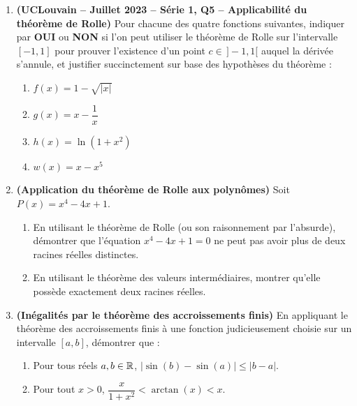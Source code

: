 \begin{enumerate}[label=\textbf{Exercice 3.\arabic* --}]
    \item \textbf{(UCLouvain -- Juillet 2023 -- Série 1, Q5 -- Applicabilité du théorème de Rolle)} Pour chacune des quatre fonctions suivantes, indiquer par \textbf{OUI} ou \textbf{NON} si l'on peut utiliser le théorème de Rolle sur l'intervalle $[-1, 1]$ pour prouver l'existence d'un point $c \in \,]-1, 1[$ auquel la dérivée s'annule, et justifier succinctement sur base des hypothèses du théorème :
    \begin{enumerate}
        \item $f(x) = 1 - \sqrt{|x|}$
        \item $g(x) = x - \dfrac{1}{x}$
        \item $h(x) = \ln(1 + x^2)$
        \item $w(x) = x - x^5$
    \end{enumerate}

    \item \textbf{(Application du théorème de Rolle aux polynômes)} Soit $P(x) = x^4 - 4x + 1$.
    \begin{enumerate}
        \item En utilisant le théorème de Rolle (ou son raisonnement par l'absurde), démontrer que l'équation $x^4 - 4x + 1 = 0$ ne peut pas avoir plus de deux racines réelles distinctes.
        \item En utilisant le théorème des valeurs intermédiaires, montrer qu'elle possède exactement deux racines réelles.
    \end{enumerate}

    \item \textbf{(Inégalités par le théorème des accroissements finis)} En appliquant le théorème des accroissements finis à une fonction judicieusement choisie sur un intervalle $[a, b]$, démontrer que :
    \begin{enumerate}
        \item Pour tous réels $a, b \in \mathbb{R}$, $\bigl|\sin(b) - \sin(a)\bigr| \le |b - a|$.
        \item Pour tout $x > 0$, $\dfrac{x}{1 + x^2} < \arctan(x) < x$.
    \end{enumerate}
\end{enumerate}
